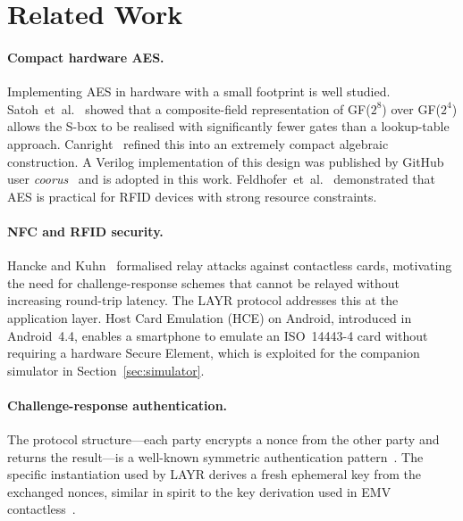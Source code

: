 \documentclass[manuscript,screen,nonacm]{acmart}
\begin{document}
\section{Related Work}
\label{sec:related}

\paragraph{Compact hardware AES.}
Implementing AES in hardware with a small footprint is well studied.
Satoh~et~al.~\cite{satoh2001} showed that a composite-field
representation of GF($2^8$) over GF($2^4$) allows the S-box to be
realised with significantly fewer gates than a lookup-table approach.
Canright~\cite{canright2005} refined this into an extremely compact
algebraic construction.
A Verilog implementation of this design was published by GitHub
user \emph{coorus}~\cite{canright_github} and is adopted in this work.
Feldhofer~et~al.~\cite{feldhofer2004rfid} demonstrated that AES is
practical for RFID devices with strong resource constraints.

\paragraph{NFC and RFID security.}
Hancke and Kuhn~\cite{hancke2005relay} formalised relay attacks against
contactless cards, motivating the need for challenge-response schemes
that cannot be relayed without increasing round-trip latency.
The LAYR protocol addresses this at the application layer.
Host Card Emulation (HCE) on Android, introduced in Android~4.4,
enables a smartphone to emulate an ISO~14443-4 card without requiring
a hardware Secure Element, which is exploited for the companion
simulator in Section~\ref{sec:simulator}.

\paragraph{Challenge-response authentication.}
The protocol structure—each party encrypts a nonce from the other party
and returns the result—is a well-known symmetric authentication
pattern~\cite{dolev1983protocol}.
The specific instantiation used by LAYR derives a fresh ephemeral key
from the exchanged nonces, similar in spirit to the key derivation
used in EMV contactless~\cite{emvco2014}.

\end{document}
